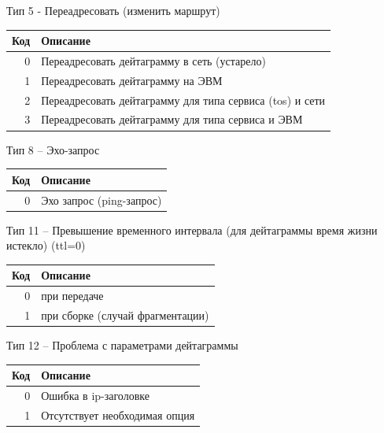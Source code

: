 \begin{frame}{Тип 5 - Переадресовать (изменить маршрут)}
	\scriptsize
	\begin{table}[ht]
	\centering
	\begin{tabular}[c]{r|l}
Код & Описание \\
	\hline
	0 & Переадресовать дейтаграмму в сеть (устарело)\\
	1 &	Переадресовать дейтаграмму на ЭВМ\\
	2 &	Переадресовать дейтаграмму для типа сервиса (tos) и сети\\
	3 & Переадресовать дейтаграмму для типа сервиса и ЭВМ\\
	\end{tabular}
	\end{table}
	\normalsize
\end{frame}

\begin{frame}{Тип 8 -- Эхо-запрос}
	\scriptsize
	\begin{table}[ht]
	\centering
	\begin{tabular}[c]{r|l}
Код & Описание \\
	\hline
		0 & Эхо запрос (ping-запрос)\\
	\end{tabular}
	\end{table}
	\normalsize
\end{frame}

\begin{frame}{Тип 11 -- Превышение временного интервала (для дейтаграммы время жизни истекло) (ttl=0)}
	\scriptsize
	\begin{table}[ht]
	\centering
	\begin{tabular}[c]{r|l}
Код & Описание \\
	\hline
		0 & при передаче\\
		1 & при сборке (случай фрагментации)\\
	\end{tabular}
	\end{table}
	\normalsize
\end{frame}

\begin{frame}{Тип 12 -- Проблема с параметрами дейтаграммы}
	\scriptsize
	\begin{table}[ht]
	\centering
	\begin{tabular}[c]{r|l}
Код & Описание \\
	\hline
		0 & Ошибка в ip-заголовке\\
		1 & Отсутствует необходимая опция\\
	\end{tabular}
	\end{table}
	\normalsize
\end{frame}

